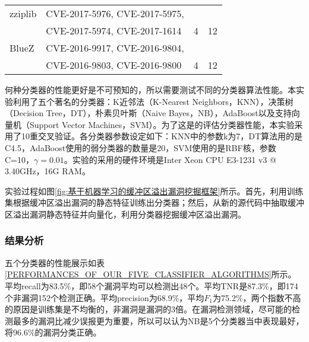 {\begin{table}[ht]
\begin{center}
\begin{small}
\begin{tabular}{llll}
zziplib & CVE-2017-5976, CVE-2017-5975,\\ & CVE-2017-5974, CVE-2017-1614 & 4 & 12\\ \hline

BlueZ & CVE-2016-9917, CVE-2016-9804,\\ & CVE-2016-9803,  CVE-2016-9800 & 4 & 12\\ \hline
\end{tabular}
\end{small}
\end{center}
\end{table}

何种分类器的性能更好是不可预知的，所以需要测试不同的分类器算法性能。本实验利用了五个著名的分类器：K近邻法（K-Nearest Neighbors，KNN），决策树（Decision Tree，DT），朴素贝叶斯（Naive Bayes，NB），AdaBoost以及支持向量机（Support Vector Machines，SVM）。为了这是的评估分类器性能，本实验采用了10重交叉验证。各分类器参数设定如下：KNN中的参数k为7，DT算法用的是C4.5，AdaBoost使用的弱分类器的数量是20，SVM使用的是RBF核，参数C=10，$\gamma = 0.01$。实验的采用的硬件环境是Inter Xeon CPU E3-1231 v3 @ 3.40GHz，16G RAM。

实验过程如图\ref{fig:基于机器学习的缓冲区溢出漏洞挖掘框架}所示。首先，利用训练集根据缓冲区溢出漏洞的静态特征训练出分类器；然后，从新的源代码中抽取缓冲区溢出漏洞静态特征并向量化，利用分类器挖掘缓冲区溢出漏洞。

\subsubsection{结果分析}

五个分类器的性能展示如表\ref{PERFORMANCES_OF_OUR_FIVE_CLASSIFIER_ALGORITHMS}所示。平均recall为83.5\%，即58个漏洞平均可以检测出48个。平均TNR是87.3\%，即174个非漏洞152个检测正确。平均precision为68.9\%，平均$F_1$为75.2\%，两个指数不高的原因是训练集是不均衡的，非漏洞是漏洞的3倍。在漏洞检测领域，尽可能的检测最多的漏洞比减少误报更为重要，所以可以认为NB是5个分类器当中表现最好，将96.6\%的漏洞分类正确。

}
